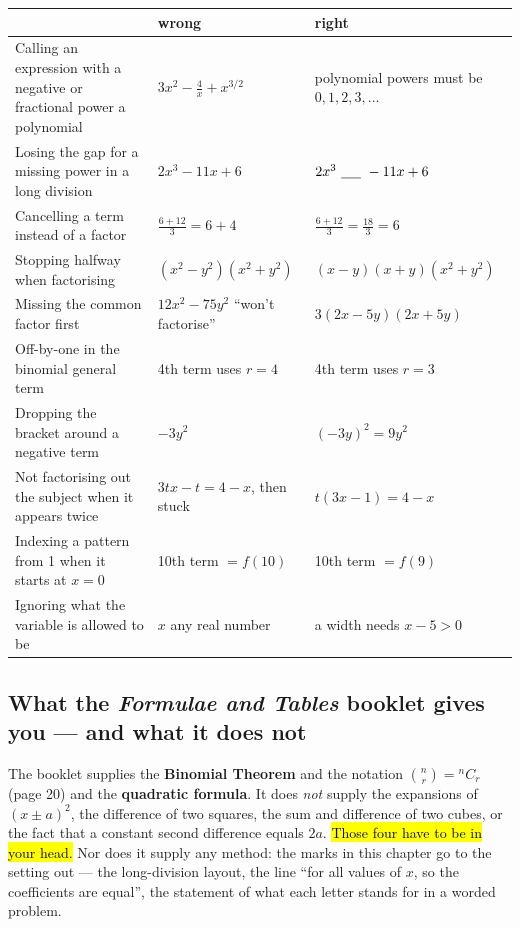 \documentclass[11pt]{article}
\newcommand{\key}[1]{\hl{#1}}
\begin{document}
\begin{tabular}{@{}p{7.6cm}p{4.0cm}p{4.0cm}@{}}
\toprule
& \textbf{\color{lilacdeep}wrong} & \textbf{\color{lilacdeep}right}\\
\midrule
Calling an expression with a negative or fractional power a polynomial & $3x^{2}-\frac4x+x^{3/2}$ & polynomial powers must be $0,1,2,3,\dots$\\
Losing the gap for a missing power in a long division & $2x^{3}-11x+6$ & $2x^{3}\ \underline{\hspace{5mm}}\ -11x+6$\\
Cancelling a term instead of a factor & $\frac{6+12}{3}=6+4$ & $\frac{6+12}{3}=\frac{18}{3}=6$\\
Stopping halfway when factorising & $(x^{2}-y^{2})(x^{2}+y^{2})$ & $(x-y)(x+y)(x^{2}+y^{2})$\\
Missing the common factor first & $12x^{2}-75y^{2}$ ``won't factorise'' & $3(2x-5y)(2x+5y)$\\
Off-by-one in the binomial general term & 4th term uses $r=4$ & 4th term uses $r=3$\\
Dropping the bracket around a negative term & $-3y^{2}$ & $(-3y)^{2}=9y^{2}$\\
Not factorising out the subject when it appears twice & $3tx-t=4-x$, then stuck & $t(3x-1)=4-x$\\
Indexing a pattern from 1 when it starts at $x=0$ & 10th term $=f(10)$ & 10th term $=f(9)$\\
Ignoring what the variable is allowed to be & $x$ any real number & a width needs $x-5>0$\\
\bottomrule
\end{tabular}

\subsection*{What the \textit{Formulae and Tables} booklet gives you --- and what it does not}

The booklet supplies the \textbf{Binomial Theorem} and the notation $\binom nr={}^nC_r$ (page 20) and the \textbf{quadratic formula}. It does \emph{not} supply the expansions of $(x\pm a)^{2}$, the difference of two squares, the sum and difference of two cubes, or the fact that a constant second difference equals $2a$. \key{Those four have to be in your head.} Nor does it supply any method: the marks in this chapter go to the setting out --- the long-division layout, the line ``for all values of $x$, so the coefficients are equal'', the statement of what each letter stands for in a worded problem.
\end{document}
